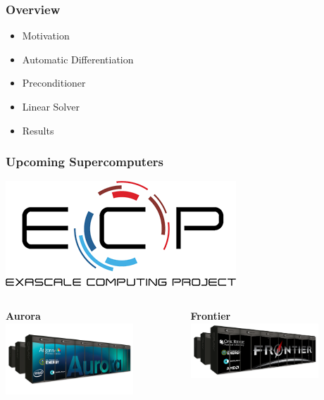 \begin{frame}
  \frametitle{Overview}
  \begin{itemize}
    \item Motivation
    \item Automatic Differentiation
    \item Preconditioner
    \item Linear Solver
    \item Results
  \end{itemize}
\end{frame}
\begin{frame}
  \frametitle{Upcoming Supercomputers}
    \begin{center}
      \includegraphics[width=.25\textwidth]{./figures/ecp} \\
    \end{center}
  \begin{columns}[T]
    \begin{column}{0.49\textwidth}
      \begin{center}
        {\bf Aurora}\\
        \includegraphics[width=0.75\textwidth]{./figures/aurora}
      \end{center}
    \end{column}
    \begin{column}{0.49\textwidth}
      \begin{center}
        {\bf Frontier}\\
        \includegraphics[width=0.75\textwidth]{./figures/frontier}

\end{center}
\end{column}
\end{columns}
\end{frame}
